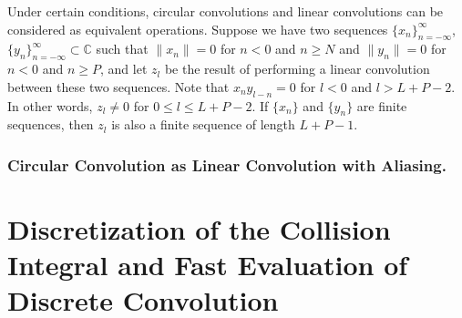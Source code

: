 \documentclass[12pt]{CSUNthesis}
\begin{document}
Under certain conditions, circular convolutions and linear convolutions can be considered as equivalent operations. Suppose we have two sequences $\{x_n\}_{n=-\infty}^{\infty}$,$\{y_n\}_{n=-\infty}^{\infty} \subset \mathbb{C}$ 
such that $\lVert x_n \lVert = 0$ for $n<0$ and $n\geq N$ and $\lVert y_n \lVert = 0$ for $n<0$ and $n \geq P$, and let $z_l$ be the result of performing a linear convolution between these two sequences. Note that $x_n y_{l-n}=0$ for $l < 0$ and $l > L + P - 2$. In other words, $z_l \not = 0$ for $0 \leq l \leq L + P - 2$. If $\{x_n\}$ and $\{y_n\}$ are finite sequences, then $z_l$ is also a finite sequence of length $L+P-1$.

\subsection{Circular Convolution as Linear Convolution with Aliasing.}





\chapter{Discretization of the Collision Integral and Fast Evaluation of Discrete Convolution}
\end{document}
